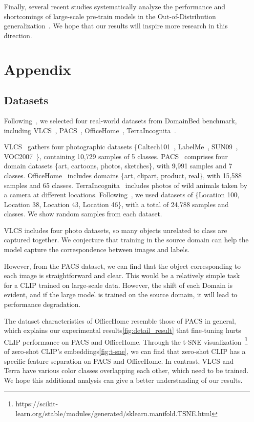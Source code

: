 \documentclass[letterpaper]{article} \usepackage[]{aaai23}
\begin{document}
Finally, several recent studies systematically analyze the performance and shortcomings of large-scale pre-train models in the Out-of-Distribution generalization~\cite{cha2022domain,wenzel2022assaying}.
We hope that our results will inspire more research in this direction.



\newpage
\section{Appendix}
\subsection{Datasets}


Following~\cite{iwasawa2021testtime}, we selected four real-world datasets from DomainBed benchmark, including VLCS~\cite{fang2013unbiased}, PACS~\cite{li2017deeper}, OfficeHome~\cite{venkateswara2017deep}, TerraIncognita~\cite{beery2018recognition}.

VLCS~\cite{fang2013unbiased} gathers four photographic datasets 
 \{Caltech101~\cite{fei2006one}, LabelMe~\cite{russell2008labelme}, SUN09~\cite{choi2010exploiting}, VOC2007~\cite{everingham2009pascal}\}, 
containing 10,729 samples of 5 classes.
PACS~\cite{li2017deeper}  comprises four domain datasets  \{art, cartoons, photos, sketches\}, with 9,991 samples and 7 classes.
OfficeHome~\cite{venkateswara2017deep}  includes domains  \{art, clipart, product, real\}, with 15,588 samples and 65 classes. 
TerraIncognita~\cite{beery2018recognition} includes photos of wild animals taken by a camera at different locations.
Following~\cite{gulrajani2020search}, we used datasets of  \{Location 100, Location 38, Location 43, Location 46\}, with a total of 24,788 samples and classes.
We show random samples from each dataset.


VLCS includes four photo datasets, so many objects unrelated to class are captured together. 
We conjecture that training in the source domain can help the model capture the correspondence between images and labels.

However, from the PACS dataset, we can find that the object corresponding to each image is straightforward and clear. 
This would be a relatively simple task for a CLIP trained on large-scale data. 
However, the shift of each Domain is evident, and if the large model is trained on the source domain, it will lead to performance degradation.

The dataset characteristics of OfficeHome resemble those of PACS in general, which explains our experimental results\autoref{fig:detail_result} that fine-tuning hurts CLIP performance on PACS and OfficeHome.
Through the t-SNE visualization~\footnote{https://scikit-learn.org/stable/modules/generated/sklearn.manifold.TSNE.html} of zero-shot CLIP's embeddings\autoref{fig:t-sne}, we can find that zero-shot CLIP has a specific feature separation on PACS and OfficeHome. In contrast, VLCS and Terra have various color classes overlapping each other, which need to be trained.
We hope this additional analysis can give a better understanding of our results.
\end{document}

